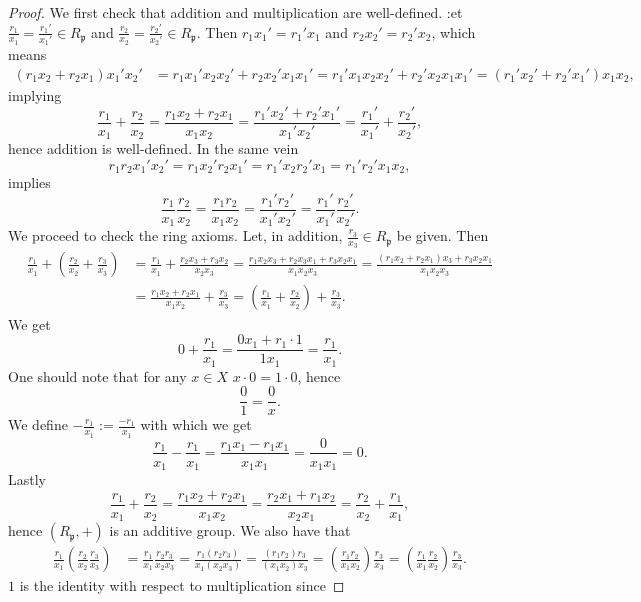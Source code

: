 \begin{proof}
    We first check that addition and multiplication are well-defined. :et $\frac{r_1}{x_1}=\frac{r_1'}{x_1'}\in R_\mathfrak{p}$ and $\frac{r_2}{x_2}=\frac{r_2'}{x_2'}\in R_\mathfrak{p}$. Then $r_1x_1' = r_1'x_1$ and $r_2x_2'=r_2'x_2$, which means
    \begin{align*}
        (r_1x_2+r_2x_1)x_1'x_2' &= r_1x_1'x_2x_2'+r_2x_2'x_1x_1' = r_1'x_1x_2x_2'+r_2'x_2x_1x_1'=\left(r_1'x_2'+r_2'x_1'\right)x_1x_2,
    \end{align*}
    implying 
    $$\frac{r_1}{x_1}+\frac{r_2}{x_2} = \frac{r_1x_2+r_2x_1}{x_1x_2} = \frac{r_1'x_2'+r_2'x_1'}{x_1'x_2'} =\frac{r_1'}{x_1'}+\frac{r_2'}{x_2'},$$ hence addition is well-defined. In the same vein 
    $$r_1r_2x_1'x_2' = r_1x_2'r_2x_1' = r_1'x_2r_2'x_1 = r_1'r_2'x_1x_2,$$
    implies 
    $$\frac{r_1}{x_1}\frac{r_2}{x_2} = \frac{r_1r_2}{x_1x_2} = \frac{r_1'r_2'}{x_1'x_2'} = \frac{r_1'}{x_1'}\frac{r_2'}{x_2'}.$$
    We proceed to check the ring axioms. Let, in addition, $\frac{r_3}{x_3}\in R_\mathfrak{p}$ be given. Then 
    \begin{align*}
        \frac{r_1}{x_1}+\left(\frac{r_2}{x_2}+\frac{r_3}{x_3}\right) &= \frac{r_1}{x_1} + \frac{r_2x_3+r_3x_2}{x_2x_3} = \frac{r_1x_2x_3+r_2x_3x_1+r_3x_2x_1}{x_1x_2x_3} = \frac{(r_1x_2+r_2x_1)x_3+r_3x_2x_1}{x_1x_2x_3} \\
        &= \frac{r_1x_2+r_2x_1}{x_1x_2}+\frac{r_3}{x_3} = \left(\frac{r_1}{x_1}+\frac{r_2}{x_2}\right) + \frac{r_3}{x_3}.
    \end{align*}
    We get
    $$0+\frac{r_1}{x_1} = \frac{0x_1+r_1\cdot 1}{1x_1} = \frac{r_1}{x_1}.$$
    One should note that for any $x\in X$ $x\cdot 0 = 1\cdot 0$, hence
    $$\frac{0}{1} = \frac{0}{x}.$$
    We define $-\frac{r_1}{x_1}:= \frac{-r_1}{x_1}$ with which we get 
    $$\frac{r_1}{x_1}-\frac{r_1}{x_1}=\frac{r_1x_1-r_1x_1}{x_1x_1} = \frac{0}{x_1x_1}= 0.$$
    Lastly 
    $$\frac{r_1}{x_1}+\frac{r_2}{x_2} = \frac{r_1x_2+r_2x_1}{x_1x_2} = \frac{r_2x_1+r_1x_2}{x_2x_1} = \frac{r_2}{x_2}+\frac{r_1}{x_1},$$
    hence $(R_\mathfrak{p},+)$ is an additive group. We also have that 
    \begin{align*}
        \frac{r_1}{x_1}\left(\frac{r_2}{x_2}\frac{r_3}{x_3}\right) &= \frac{r_1}{x_1}\frac{r_2r_3}{x_2x_3} = \frac{r_1(r_2r_3)}{x_1(x_2x_3)} = \frac{(r_1r_2)r_3}{(x_1x_2)x_3} = \left(\frac{r_1r_2}{x_1x_2}\right)\frac{r_3}{x_3} = \left(\frac{r_1}{x_1}\frac{r_2}{x_2} \right)\frac{r_3}{x_3}.
    \end{align*}
    $1$ is the identity with respect to multiplication since 

\end{proof}
